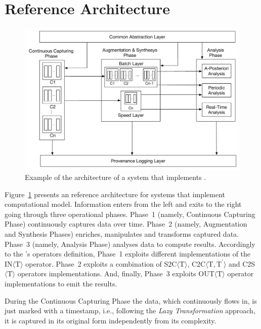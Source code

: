 \section{Reference Architecture}\label{sec:comp-mod-sol-arch}

\begin{figure}[t]
    \centering
    \includegraphics[width=\columnwidth]{img/computational-model-architecture}
    \caption{Example of the architecture of a system that implements \textnormal{\protect\river{}}.}
    \label{fig:arch}
\end{figure}

Figure~\ref{fig:arch} presents an reference architecture for systems that implement \river{} computational model. Information enters from the left and exits to the right going through three operational phases. 
Phase~1 (namely, Continuous Capturing Phase) continuously captures data over time. 
Phase~2 (namely, Augmentation and Synthesis Phases) enriches, manipulates and transforms captured data. 
Phase~3 (namely, Analysis Phase) analyses data to compute results.
Accordingly to the \river{}'s operators definition, Phase~1 exploits different implementations of the IN$\langle\mathrm{T}\rangle$ operator. 
Phase~2 exploits a combination of S2C$\langle\mathrm{T}\rangle$, C2C$\langle\mathrm{T},\mathrm{T^{\prime}}\rangle$ and C2S$\langle\mathrm{T}\rangle$ operators implementations. And, finally, Phase~3 exploits OUT$\langle\mathrm{T}\rangle$ operator implementations to emit the results.

During the Continuous Capturing Phase the data, which continuously flows in, is just marked with a timestamp, i.e., following the \textit{Lazy Transformation} approach, it is captured in its original form independently from its complexity.  

